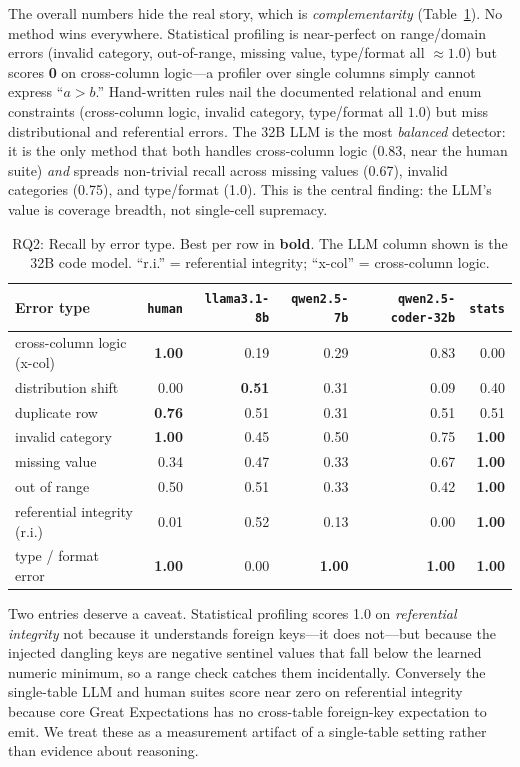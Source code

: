 \documentclass[10pt,twocolumn]{article}
\newcommand{\best}[1]{\textbf{#1}}
\begin{document}
The overall numbers hide the real story, which is \emph{complementarity}
(Table~\ref{tab:bytype}). No method wins everywhere. Statistical profiling is
near-perfect on range/domain errors (invalid category, out-of-range,
missing value, type/format all $\approx 1.0$) but scores \best{0} on
cross-column logic---a profiler over single columns simply cannot express
``$a > b$.'' Hand-written rules nail the documented relational and enum
constraints (cross-column logic, invalid category, type/format all $1.0$) but
miss distributional and referential errors. The 32B LLM is the most
\emph{balanced} detector: it is the only method that both handles cross-column
logic (0.83, near the human suite) \emph{and} spreads non-trivial recall across
missing values (0.67), invalid categories (0.75), and type/format (1.0). This is
the central finding: the LLM's value is coverage breadth, not single-cell
supremacy.

\begin{table}[t]
\centering\small
\caption{RQ2: Recall by error type. Best per row in \textbf{bold}. The LLM
column shown is the 32B code model. ``r.i.'' = referential integrity;
``x-col'' = cross-column logic.}
\label{tab:bytype}
\begin{tabular}{lrrrrr}
\toprule
Error type & \texttt{human} & \texttt{llama3.1-8b} & \texttt{qwen2.5-7b} & \texttt{qwen2.5-coder-32b} & \texttt{stats} \\
\midrule
cross-column logic (x-col) & \best{1.00} & 0.19 & 0.29 & 0.83 & 0.00 \\
distribution shift         & 0.00 & \best{0.51} & 0.31 & 0.09 & 0.40 \\
duplicate row              & \best{0.76} & 0.51 & 0.31 & 0.51 & 0.51 \\
invalid category           & \best{1.00} & 0.45 & 0.50 & 0.75 & \best{1.00} \\
missing value              & 0.34 & 0.47 & 0.33 & 0.67 & \best{1.00} \\
out of range               & 0.50 & 0.51 & 0.33 & 0.42 & \best{1.00} \\
referential integrity (r.i.) & 0.01 & 0.52 & 0.13 & 0.00 & \best{1.00} \\
type / format error        & \best{1.00} & 0.00 & \best{1.00} & \best{1.00} & \best{1.00} \\
\bottomrule
\end{tabular}
\end{table}

Two entries deserve a caveat. Statistical profiling scores 1.0 on
\emph{referential integrity} not because it understands foreign keys---it does
not---but because the injected dangling keys are negative sentinel values that
fall below the learned numeric minimum, so a range check catches them
incidentally. Conversely the single-table LLM and human suites score near zero on
referential integrity because core Great Expectations has no cross-table foreign-key
expectation to emit. We treat these as a measurement artifact of a single-table
setting rather than evidence about reasoning.
\end{document}
